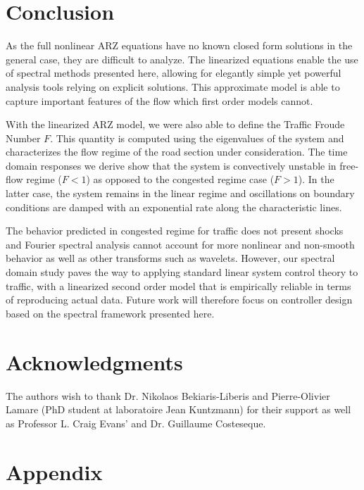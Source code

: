 \documentclass[letterpaper, 10 pt, conference]{ieeeconf}  %
\begin{document}
\section{Conclusion}

As the full nonlinear ARZ equations have no known closed form solutions in the general case, they are difficult to analyze. The linearized equations enable the use of spectral methods presented here, allowing for elegantly simple yet powerful analysis tools relying on explicit solutions. This approximate model is able to capture important features of the flow which first order models cannot. 

With the linearized ARZ model, we were also able to define the Traffic Froude Number $F$. This quantity is computed using the eigenvalues of the system and characterizes the flow regime of the road section under consideration. The time domain responses we derive show that the system is convectively unstable in free-flow regime ($F < 1$) as opposed to the congested regime case ($F>1$). In the latter case, the system remains in the linear regime and oscillations on boundary conditions are damped with an exponential rate along the characteristic lines.

The behavior predicted in congested regime for traffic does not present shocks and Fourier spectral analysis cannot account for more nonlinear and non-smooth behavior as well as other transforms such as wavelets. However, our spectral domain study paves the way to applying standard linear system control theory to traffic, with a linearized second order model that is empirically reliable in terms of reproducing actual data. Future work will therefore focus on controller design based on the spectral framework presented here.

\section*{Acknowledgments}
{\footnotesize
The authors wish to thank Dr. Nikolaos Bekiaris-Liberis and Pierre-Olivier Lamare (PhD student at laboratoire Jean Kuntzmann) for their support as well as Professor L. Craig Evans' and Dr. Guillaume Costeseque.
}




\newpage

\section*{Appendix}
\end{document}
